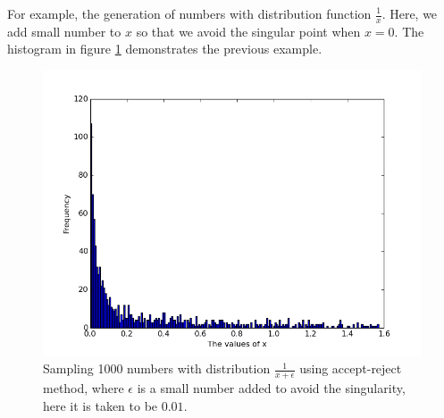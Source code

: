  
For example, the generation of numbers with  distribution function $\frac{1}{x}$. 
Here, we add small number to $x$ so that we avoid the singular point when $x = 0$. The histogram in figure \ref{fig:2} demonstrates the previous example. 



\begin{figure}[hbtp]
\centering
\includegraphics[scale=.5]{images/inverse_method.png}
\caption{Sampling 1000 numbers with distribution $\frac{1}{x+\epsilon}$ using accept-reject method, where $\epsilon$ is a small number added to avoid the singularity, here it is taken to be $0.01$.}\label{fig:2}
\end{figure}

